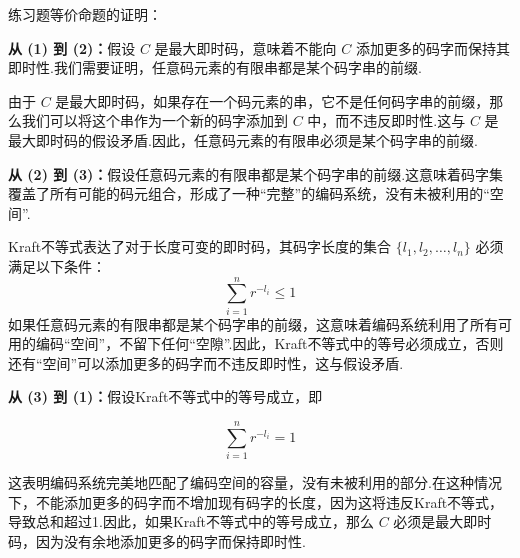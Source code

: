 \newpage
\begin{mdframed}[frametitle={等价证明}, frametitlerule=true, frametitlebackgroundcolor=yellow!20]

练习题等价命题的证明：

 \textbf{从 (1) 到 (2)：}假设 $C$ 是最大即时码，意味着不能向 $C$ 添加更多的码字而保持其即时性.我们需要证明，任意码元素的有限串都是某个码字串的前缀.

由于 $C$ 是最大即时码，如果存在一个码元素的串，它不是任何码字串的前缀，那么我们可以将这个串作为一个新的码字添加到 $C$ 中，而不违反即时性.这与 $C$ 是最大即时码的假设矛盾.因此，任意码元素的有限串必须是某个码字串的前缀.

 \textbf{从 (2) 到 (3)：}假设任意码元素的有限串都是某个码字串的前缀.这意味着码字集覆盖了所有可能的码元组合，形成了一种“完整”的编码系统，没有未被利用的“空间”.

Kraft不等式表达了对于长度可变的即时码，其码字长度的集合 $\{l_1, l_2, \ldots, l_n\}$ 必须满足以下条件：
\[
\sum_{i=1}^{n} r^{-l_i} \leq 1
\]
如果任意码元素的有限串都是某个码字串的前缀，这意味着编码系统利用了所有可用的编码“空间”，不留下任何“空隙”.因此，Kraft不等式中的等号必须成立，否则还有“空间”可以添加更多的码字而不违反即时性，这与假设矛盾.

\textbf{ 从 (3) 到 (1)：}假设Kraft不等式中的等号成立，即

\[
\sum_{i=1}^{n} r^{-l_i} = 1
\]

这表明编码系统完美地匹配了编码空间的容量，没有未被利用的部分.在这种情况下，不能添加更多的码字而不增加现有码字的长度，因为这将违反Kraft不等式，导致总和超过1.因此，如果Kraft不等式中的等号成立，那么 $C$ 必须是最大即时码，因为没有余地添加更多的码字而保持即时性.
\end{mdframed}









